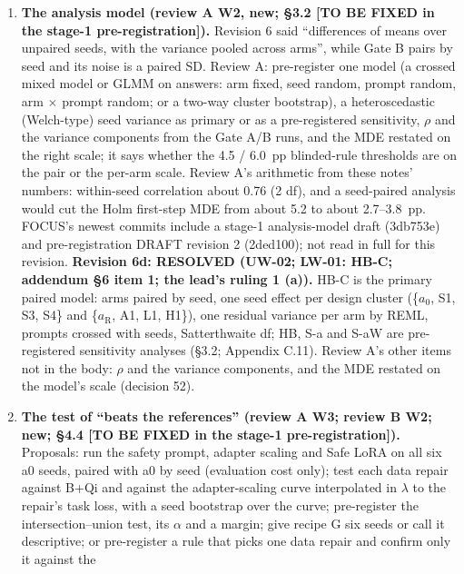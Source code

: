 \documentclass{article}
\theoremstyle{plain}
\theoremstyle{definition}
\theoremstyle{remark}
\begin{document}
\begin{enumerate}
        \S{}4.1, or move it to \S{}5 with the numbers.
  \item \textbf{The analysis model (review A W2, new; \S{}3.2 [TO BE FIXED in
        the stage-1 pre-registration]).} Revision 6 said ``differences of means
        over unpaired seeds, with the variance pooled across arms'', while Gate
        B pairs by seed and its noise is a paired SD. Review A: pre-register one
        model (a crossed mixed model or GLMM on answers: arm fixed, seed random,
        prompt random, arm $\times$ prompt random; or a two-way cluster
        bootstrap), a heteroscedastic (Welch-type) seed variance as primary or
        as a pre-registered sensitivity, $\rho$ and the variance components from
        the Gate A/B runs, and the MDE restated on the right scale; it says
        whether the 4.5 / 6.0~pp blinded-rule thresholds are on the pair or the
        per-arm scale. Review A's arithmetic from these notes' numbers:
        within-seed correlation about 0.76 (2 df), and a seed-paired analysis
        would cut the Holm first-step MDE from about 5.2 to about 2.7--3.8~pp.
        FOCUS's newest commits include a stage-1 analysis-model draft (3db753e)
        and pre-registration DRAFT revision 2 (2ded100); not read in full for
        this revision. \textbf{Revision 6d: RESOLVED (UW-02; LW-01: HB-C;
        addendum \S{}6 item 1; the lead's ruling 1 (a)).} HB-C is the primary
        paired model: arms paired by seed, one seed effect per design cluster
        (\{$a_0$, S1, S3, S4\} and \{$a_{\mathrm{R}}$, A1, L1, H1\}), one
        residual variance per arm by REML, prompts crossed with seeds,
        Satterthwaite df; HB, S-a and S-aW are pre-registered sensitivity
        analyses (\S{}3.2; Appendix C.11). Review A's other items not in the
        body: $\rho$ and the variance components, and the MDE restated on the
        model's scale (decision 52).
  \item \textbf{The test of ``beats the references'' (review A W3; review B W2;
        new; \S{}4.4 [TO BE FIXED in the stage-1 pre-registration]).} Proposals:
        run the safety prompt, adapter scaling and Safe LoRA on all six a0
        seeds, paired with a0 by seed (evaluation cost only); test each data
        repair against B+Qi and against the adapter-scaling curve interpolated
        in $\lambda$ to the repair's task loss, with a seed bootstrap over the
        curve; pre-register the intersection--union test, its $\alpha$ and a
        margin; give recipe G six seeds or call it descriptive; or pre-register
        a rule that picks one data repair and confirm only it against the

\end{enumerate}
\end{document}
